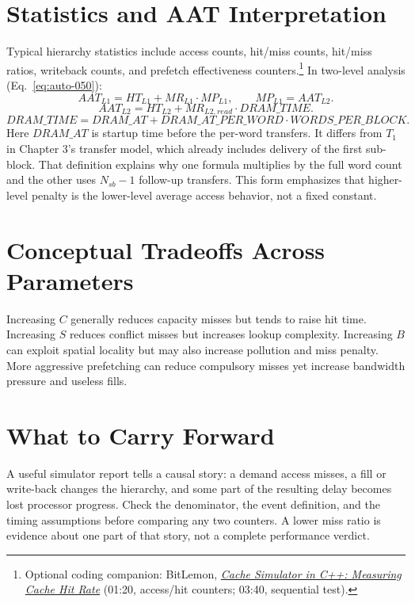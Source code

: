 \section{Statistics and AAT Interpretation}\label{sec:auto-053}
Typical hierarchy statistics include access counts, hit/miss counts, hit/miss ratios, writeback counts, and prefetch effectiveness counters.\footnote{Optional coding companion: BitLemon, \href{https://youtu.be/y9xDHGzSAyg?t=80}{\emph{Cache Simulator in C++: Measuring Cache Hit Rate}} (01:20, access/hit counters; 03:40, sequential test).}
In two-level analysis (Eq.~\eqref{eq:auto-050}):
\begin{equation}\label{eq:auto-050}
    AAT_{L1}=HT_{L1}+MR_{L1}\cdot MP_{L1},\qquad MP_{L1}=AAT_{L2}.
\end{equation}
\begin{equation}\label{eq:auto-051}
    AAT_{L2}=HT_{L2}+MR_{L2,read}\cdot DRAM\_TIME.
\end{equation}
\begin{equation}\label{eq:auto-052}
    DRAM\_TIME = DRAM\_AT + DRAM\_AT\_PER\_WORD\cdot WORDS\_PER\_BLOCK.
\end{equation}
Here $DRAM\_AT$ is startup time before the per-word transfers.
It differs from $T_1$ in Chapter 3's transfer model, which already includes delivery of the first sub-block.
That definition explains why one formula multiplies by the full word count and the other uses $N_{sb}-1$ follow-up transfers.
This form emphasizes that higher-level penalty is the lower-level average access behavior, not a fixed constant.


\section{Conceptual Tradeoffs Across Parameters}\label{sec:auto-054}
Increasing $C$ generally reduces capacity misses but tends to raise hit time.
Increasing $S$ reduces conflict misses but increases lookup complexity.
Increasing $B$ can exploit spatial locality but may also increase pollution and miss penalty.
More aggressive prefetching can reduce compulsory misses yet increase bandwidth pressure and useless fills.


\section{What to Carry Forward}\label{sec:auto-055}
A useful simulator report tells a causal story: a demand access misses, a fill or write-back changes the hierarchy, and some part of the resulting delay becomes lost processor progress.
Check the denominator, the event definition, and the timing assumptions before comparing any two counters.
A lower miss ratio is evidence about one part of that story, not a complete performance verdict.

